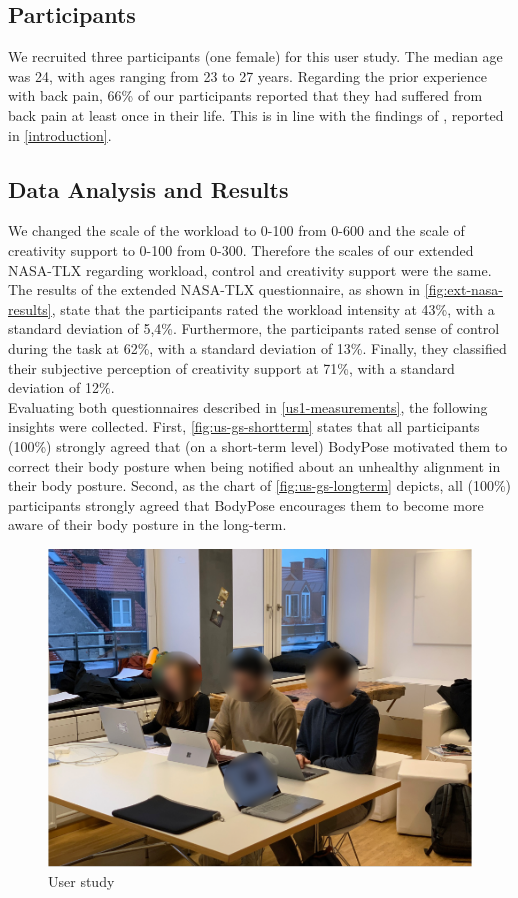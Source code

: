 \subsection{Participants}
\label{us1-participants}
We recruited three participants (one female) for this user study. The median age was 24, with ages ranging from 23 to 27 years. Regarding the prior experience with back pain, 66\% of our participants reported that they had suffered from back pain at least once in their life. This is in line with the findings of \cite{osha2000facts}, reported in \autoref{introduction}.

\subsection{Data Analysis and Results}
\label{us1-data-analysis-results}
We changed the scale of the workload to 0-100 from 0-600 and the scale of creativity support to 0-100 from 0-300. Therefore the scales of our extended NASA-TLX regarding workload, control and creativity support were the same. The results of the extended NASA-TLX questionnaire, as shown in \autoref{fig:ext-nasa-results}, state that the participants rated the workload intensity at 43\%, with a standard deviation of 5,4\%. Furthermore, the participants rated sense of control during the task at 62\%, with a standard deviation of 13\%. Finally, they classified their subjective perception of creativity support at 71\%, with a standard deviation of 12\%.\\
Evaluating both questionnaires described in \autoref{us1-measurements}, the following insights were collected. First, \autoref{fig:us-gs-shortterm} states that all participants (100\%) strongly agreed that (on a short-term level) BodyPose motivated them to correct their body posture when being notified about an unhealthy alignment in their body posture.
Second, as the chart of \autoref{fig:us-gs-longterm} depicts, all (100\%) participants strongly agreed that BodyPose encourages them to become more aware of their body posture in the long-term.

\begin{figure}[htpb]
\centering
  \includegraphics[width=0.9\linewidth]{media/user-study-1.png}
  \caption{User study}
  \label{fig:user-study-1}
\end{figure}

